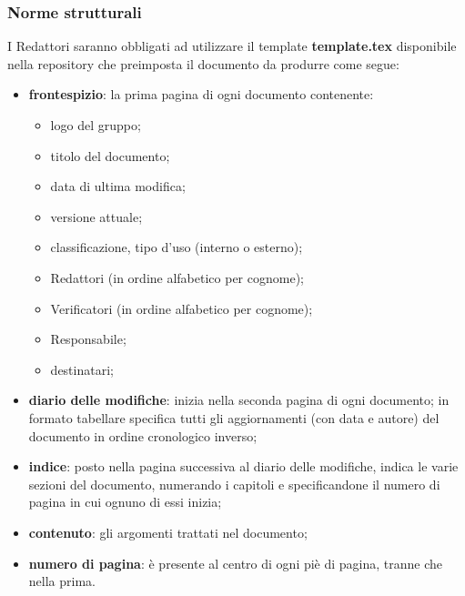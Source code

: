 	\subsubsection{Norme strutturali}
	I Redattori saranno obbligati ad utilizzare il template \textbf{template.tex} disponibile nella repository che preimposta il documento da produrre come segue:
	\begin{itemize}
		\item \textbf{frontespizio}: la prima pagina di ogni documento contenente:
			\begin{itemize}
				\item logo del gruppo;
				\item titolo del documento;
				\item data di ultima modifica;
				\item versione attuale;
				\item classificazione, tipo d'uso (interno o esterno);
				\item Redattori (in ordine alfabetico per cognome);
				\item Verificatori (in ordine alfabetico per cognome);
				\item Responsabile;
                \item destinatari;
			\end{itemize}
		\item \textbf{diario delle modifiche}: inizia nella seconda pagina di ogni documento; in formato tabellare specifica tutti gli aggiornamenti (con data e autore) del documento in ordine cronologico inverso;
		\item \textbf{indice}: posto nella pagina successiva al diario delle modifiche, indica le varie sezioni del documento, numerando i capitoli e specificandone il numero di pagina in cui ognuno di essi inizia;
		\item \textbf{contenuto}: gli argomenti trattati nel documento;
		\item \textbf{numero di pagina}: è presente al centro di ogni piè di pagina, tranne che nella prima.
	\end{itemize}

